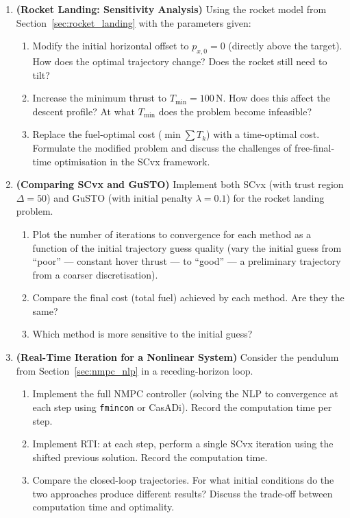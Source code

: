 \begin{enumerate}
\item \textbf{(Rocket Landing: Sensitivity Analysis)}
Using the rocket model from Section~\ref{sec:rocket_landing} with the parameters given:
\begin{enumerate}
	\item Modify the initial horizontal offset to $p_{x,0} = 0$ (directly above the target). How does the optimal trajectory change? Does the rocket still need to tilt?
	\item Increase the minimum thrust to $T_{\min} = 100$\,N. How does this affect the descent profile? At what $T_{\min}$ does the problem become infeasible?
	\item Replace the fuel-optimal cost ($\min \sum T_k$) with a time-optimal cost. Formulate the modified problem and discuss the challenges of free-final-time optimisation in the SCvx framework.
\end{enumerate}

\item \textbf{(Comparing SCvx and GuSTO)}
Implement both SCvx (with trust region $\Delta = 50$) and GuSTO (with initial penalty $\lambda = 0.1$) for the rocket landing problem.
\begin{enumerate}
	\item Plot the number of iterations to convergence for each method as a function of the initial trajectory guess quality (vary the initial guess from ``poor'' --- constant hover thrust --- to ``good'' --- a preliminary trajectory from a coarser discretisation).
	\item Compare the final cost (total fuel) achieved by each method. Are they the same?
	\item Which method is more sensitive to the initial guess?
\end{enumerate}

\item \textbf{(Real-Time Iteration for a Nonlinear System)}
Consider the pendulum from Section~\ref{sec:nmpc_nlp} in a receding-horizon loop.
\begin{enumerate}
	\item Implement the full NMPC controller (solving the NLP to convergence at each step using \texttt{fmincon} or CasADi). Record the computation time per step.
	\item Implement RTI: at each step, perform a single SCvx iteration using the shifted previous solution. Record the computation time.
	\item Compare the closed-loop trajectories. For what initial conditions do the two approaches produce different results? Discuss the trade-off between computation time and optimality.
\end{enumerate}


\end{enumerate}
